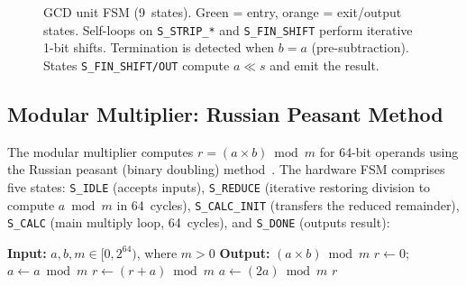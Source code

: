 \documentclass[lettersize,journal]{IEEEtran}
\begin{document}
\begin{figure}[!t]
\caption{GCD unit FSM (9~states). Green = entry, orange = exit/output states. Self-loops on \texttt{S\_STRIP\_*} and \texttt{S\_FIN\_SHIFT} perform iterative 1-bit shifts. Termination is detected when $b = a$ (pre-subtraction). States \texttt{S\_FIN\_SHIFT/OUT} compute $a \ll s$ and emit the result.}
\label{fig:gcd_fsm}
\end{figure}

\subsection{Modular Multiplier: Russian Peasant Method}

The modular multiplier computes $r = (a \times b) \bmod m$ for 64-bit operands using the Russian peasant (binary doubling) method~\cite{knuth1997}. The hardware FSM comprises five states: \texttt{S\_IDLE} (accepts inputs), \texttt{S\_REDUCE} (iterative restoring division to compute $a \bmod m$ in 64~cycles), \texttt{S\_CALC\_INIT} (transfers the reduced remainder), \texttt{S\_CALC} (main multiply loop, 64~cycles), and \texttt{S\_DONE} (outputs result):

\begin{algorithm}[!t]
\caption{Russian Peasant Modular Multiplication}\label{alg:mulmod}
\begin{algorithmic}
\STATE \textbf{Input:} $a, b, m \in [0, 2^{64})$, where $m > 0$
\STATE \textbf{Output:} $(a \times b) \bmod m$
\STATE $r \gets 0$;~$a \gets a \bmod m$
        \STATE $r \gets (r + a) \bmod m$ 
    \ENDIF
    \STATE $a \gets (2a) \bmod m$ 
\ENDFOR
\RETURN $r$
\end{algorithmic}
\end{algorithm}
\end{document}

